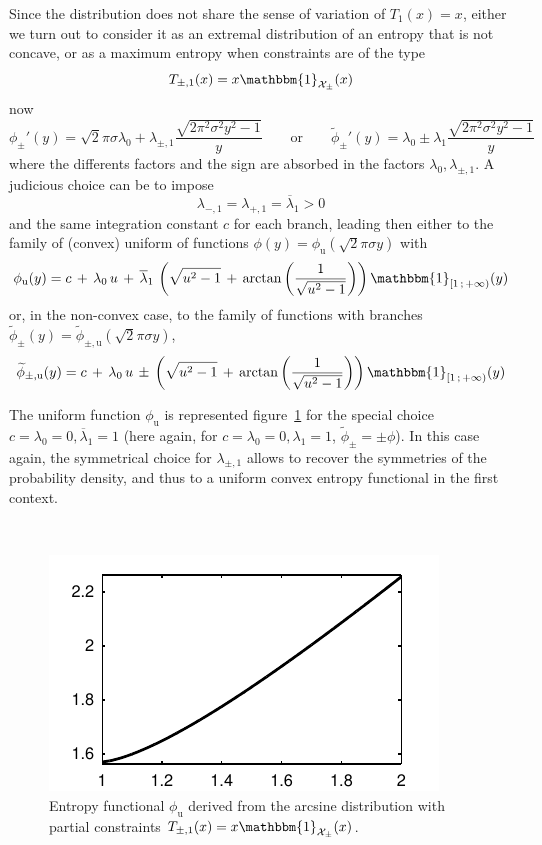 \documentclass[english,sort&compress]{elsarticle}
\theoremstyle{definition}
\theoremstyle{plain}
\theoremstyle{plain}
\def\X{\mathcal{X}}
\def\un{\mathbbm{1}}
\begin{document}
Since the  distribution does not share the  sense of variation of  $T_1(x) = x$,
either we turn out to consider it as an extremal distribution of an entropy that
is not concave, or as a maximum entropy when constraints are of the type
%
\[
T_{\pm,1}(x) = x \un_{\X_\pm}(x)
\]
%
now 
%
\[
\phi_\pm'(y) = \sqrt2 \pi \sigma \lambda_0 + \lambda_{\pm,1} \frac{\sqrt{2 \pi^2
    \sigma^2  y^2 -  1}}{y} \qquad  \mbox{or} \qquad  \widetilde{\phi}_\pm'(y) =
\lambda_0 \pm \lambda_1 \frac{\sqrt{2 \pi^2 \sigma^2 y^2 - 1}}{y}
\]
%
where  the  differents  factors  and  the  sign  are  absorbed  in  the  factors
$\lambda_0, \lambda_{\pm,1}$. A judicious choice can be to impose
%
\[
\lambda_{-,1} = \lambda_{+,1} = \overline{\lambda}_1 > 0
\]
%
and the  same integration constant $c$  for each branch, leading  then either to
the family of (convex)  uniform of functions $\phi(y) = \phi_{\mathrm{u}}(\sqrt2
\pi \sigma y)$ with
%
\[
\phi_{\mathrm{u}}(y) = c \, + \,  \lambda_0 \, u \, + \, \overline{\lambda}_1 \,
\left( \sqrt{u^2  - 1}  \, + \,  \arctan\left( \frac{1}{\sqrt{u^2 -  1}} \right)
\right) \un_{\left[1 \, ; \, +\infty \right)}(y)
\]
%
or,  in  the  non-convex  case,   to  the  family  of  functions  with  branches
$\widetilde{\phi}_{\pm}(y) = \widetilde{\phi}_{\pm,\mathrm{u}}(\sqrt2 \pi \sigma
y)$,
%
\[
\widetilde{\phi}_{\pm,\mathrm{u}}(y) = c \, + \, \lambda_0 \, u \, \pm \, \left(
  \sqrt{u^2 - 1} \, +  \, \arctan\left( \frac{1}{\sqrt{u^2 - 1}} \right) \right)
\un_{\left[ 1 \, ; \, +\infty \right)}(y)
\]


The      uniform      function      $\phi_{\mathrm{u}}$      is      represented
figure~\ref{fig:Entropy-arcsin}  for the  special  choice $c  =  \lambda_0 =  0,
\overline{\lambda}_1 = 1$  (here again, for $c = \lambda_0 =  0, \lambda_1 = 1$,
$\widetilde{\phi}_\pm = \pm \phi$).  In  this case again, the symmetrical choice
for  $\lambda_{\pm,1}$  allows to  recover  the  symmetries  of the  probability
density, and thus to a uniform convex entropy functional in the first context.

\
 
\begin{figure}[htbp]
\centerline{\includegraphics[width=.43\textwidth]{PDF/MaxEnt_ArcsineLaw}}
\caption{Entropy  functional   $\phi_{\mathrm{u}}$  derived  from   the  arcsine
  distribution with partial constraints $T_{\pm,1}(x) = x \un_{\X_\pm}(x)$.}
\label{fig:Entropy-arcsin}
\end{figure}
\end{document}
